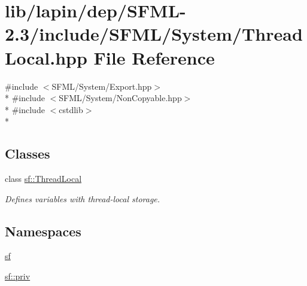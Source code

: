 \hypertarget{lapin_2dep_2_s_f_m_l-2_83_2include_2_s_f_m_l_2_system_2_thread_local_8hpp}{\section{lib/lapin/dep/\-S\-F\-M\-L-\/2.3/include/\-S\-F\-M\-L/\-System/\-Thread\-Local.hpp File Reference}
\label{lapin_2dep_2_s_f_m_l-2_83_2include_2_s_f_m_l_2_system_2_thread_local_8hpp}
}
{\ttfamily \#include $<$S\-F\-M\-L/\-System/\-Export.\-hpp$>$}\\*
{\ttfamily \#include $<$S\-F\-M\-L/\-System/\-Non\-Copyable.\-hpp$>$}\\*
{\ttfamily \#include $<$cstdlib$>$}\\*
\subsection*{Classes}
\begin{DoxyCompactItemize}
\item 
class \hyperlink{classsf_1_1_thread_local}{sf\-::\-Thread\-Local}
\begin{DoxyCompactList}\small\item\em Defines variables with thread-\/local storage. \end{DoxyCompactList}\end{DoxyCompactItemize}
\subsection*{Namespaces}
\begin{DoxyCompactItemize}
\item 
\hyperlink{namespacesf}{sf}
\item 
\hyperlink{namespacesf_1_1priv}{sf\-::priv}
\end{DoxyCompactItemize}
